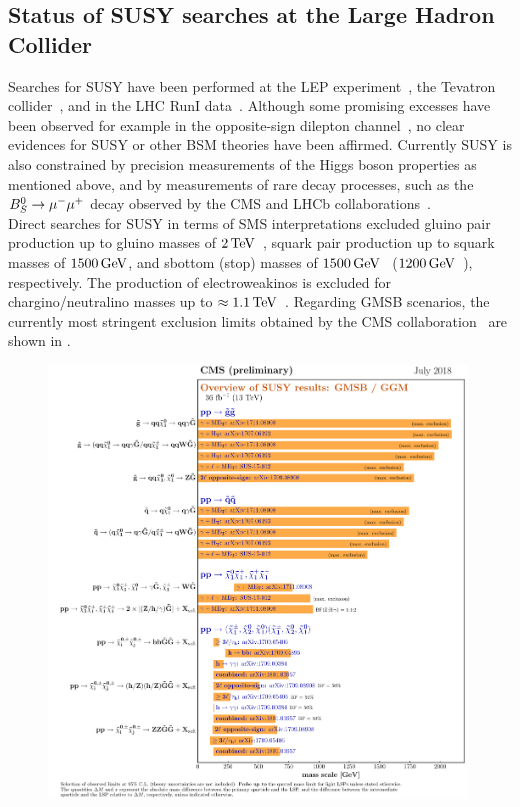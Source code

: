 \begin{enumerate}
\subsection{Status of SUSY searches at the Large Hadron Collider}
Searches for SUSY have been performed  at the LEP experiment~\cite{LEP}, the Tevatron collider~\cite{TEVATRON}, and in the LHC RunI data~\cite{ChristianRunI}. Although some promising excesses have been observed for example in the opposite-sign dilepton channel~\cite{Edge}, no clear evidences for SUSY or other BSM theories have been affirmed. Currently SUSY is also constrained by precision measurements of the Higgs boson properties as mentioned above, and by measurements of rare decay processes, such as the $B_S^0\to{\mu^-}{\mu^+}$ decay observed by the CMS and LHCb collaborations~\cite{B0S}.\\
Direct searches for SUSY in terms of SMS interpretations excluded gluino pair production up to gluino masses of $2\,\text{Te\hspace{-.08em}V}$~\cite{GluinoCMS}, squark pair production up to squark masses of $1500\,\text{Ge\hspace{-.08em}V}$, and sbottom (stop) masses of $1500\,\text{Ge\hspace{-.08em}V}$~\cite{sbottom} ($1200\,\text{Ge\hspace{-.08em}V}$~\cite{stop}), respectively. The production of electroweakinos is excluded for chargino/neutralino masses up to $\approx 1.1\,\text{Te\hspace{-.08em}V}$~\cite{EWKinos}.
Regarding GMSB scenarios, the currently most stringent exclusion limits obtained by the CMS collaboration~\cite{CMS} are shown in .
\begin{figure}[tbp]
 \centering
 \includegraphics[width=0.99\textwidth]{figures/general/barplot_GMSB}

\end{figure}
\end{enumerate}
